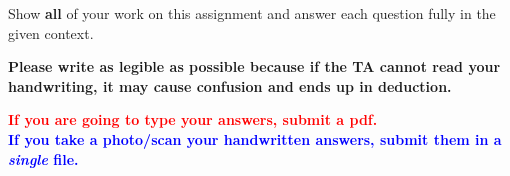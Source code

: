 \documentclass[11pt]{article}\usepackage[]{graphicx}\usepackage[]{color}
\begin{document}

\pagestyle{fancy} 

Show \textbf{all} of your work on this assignment and answer each question fully in the given context. 

\vspace{0.3cm}

\textbf{Please write as legible as possible because if the TA cannot read your handwriting, it may cause confusion and ends up in deduction.}

\vspace{0.3cm}

\textbf{\textcolor{red}{If you are going to type your answers, submit a pdf. }\\
\textcolor{blue}{ If you take a photo/scan your handwritten answers, submit them in a \emph{single} file.}} \\
\end{document}

